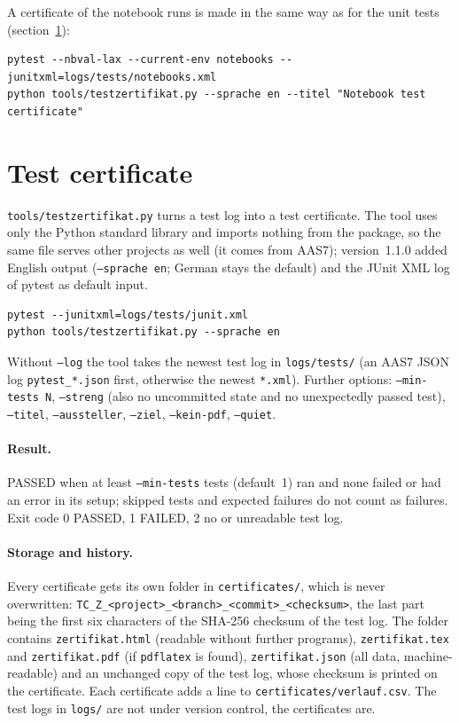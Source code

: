 A certificate of the notebook runs is made in the same way as for the
unit tests (section~\ref{sec:certificate}):
\begin{lstlisting}[basicstyle=\ttfamily\footnotesize, frame=single]
pytest --nbval-lax --current-env notebooks --junitxml=logs/tests/notebooks.xml
python tools/testzertifikat.py --sprache en --titel "Notebook test certificate"
\end{lstlisting}

\section{Test certificate}\label{sec:certificate}

\texttt{tools/testzertifikat.py} turns a test log into a test
certificate. The tool uses only the Python standard library and imports
nothing from the package, so the same file serves other projects as well
(it comes from AAS7); version~1.1.0 added English output
(\texttt{--sprache en}; German stays the default) and the JUnit XML log
of pytest as default input.
\begin{lstlisting}[basicstyle=\ttfamily\footnotesize, frame=single]
pytest --junitxml=logs/tests/junit.xml
python tools/testzertifikat.py --sprache en
\end{lstlisting}
Without \texttt{--log} the tool takes the newest test log in
\texttt{logs/tests/} (an AAS7 JSON log \texttt{pytest\_*.json} first,
otherwise the newest \texttt{*.xml}). Further options:
\texttt{--min-tests N}, \texttt{--streng} (also no uncommitted state and no
unexpectedly passed test), \texttt{--titel}, \texttt{--aussteller},
\texttt{--ziel}, \texttt{--kein-pdf}, \texttt{--quiet}.

\paragraph*{Result.} PASSED when at least \texttt{--min-tests} tests
(default~1) ran and none failed or had an error in its setup; skipped
tests and expected failures do not count as failures. Exit code 0 PASSED,
1 FAILED, 2 no or unreadable test log.

\paragraph*{Storage and history.} Every certificate gets its own folder in
\texttt{certificates/}, which is never overwritten:
\texttt{TC\_<UTC time>Z\_<project>\_<branch>\_<commit>\_<checksum>}, the
last part being the first six characters of the SHA-256 checksum of the
test log. The folder contains \texttt{zertifikat.html} (readable without
further programs), \texttt{zertifikat.tex} and \texttt{zertifikat.pdf}
(if \texttt{pdflatex} is found), \texttt{zertifikat.json} (all data,
machine-readable) and an unchanged copy of the test log, whose checksum
is printed on the certificate. Each certificate adds a line to
\texttt{certificates/verlauf.csv}. The test logs in \texttt{logs/} are not
under version control, the certificates are.

